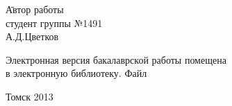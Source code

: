\begin{tabbing}
\hspace{10cm}\=Автор работы\\
\>студент группы №1491\\
\>\makebox[3cm]{\hrulefill}А.Д.Цветков\\
\end{tabbing}

\vspace{0.8cm}

\hspace{-0.65cm}Электронная версия бакалаврской работы помещена\\
в электронную библиотеку. Файл

\vspace{1.2cm}

\begin{center}
Томск 2013
\end{center}
\normalsize
